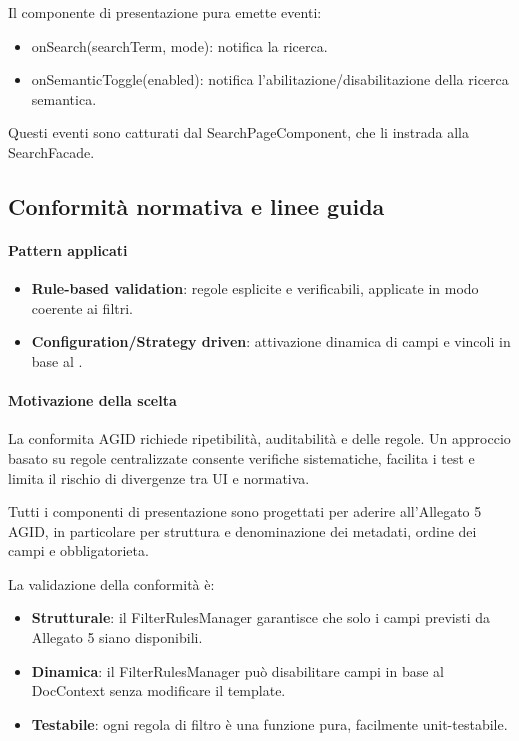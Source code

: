 \noindent Il componente di presentazione pura emette eventi:
\begin{itemize}
    \item onSearch(searchTerm, mode): notifica la ricerca.
    \item onSemanticToggle(enabled): notifica l'abilitazione/disabilitazione della ricerca semantica.
\end{itemize}

\noindent Questi eventi sono catturati dal SearchPageComponent, che li instrada alla SearchFacade.


\subsection{Conformità normativa e linee guida}

\paragraph{Pattern applicati}
\begin{itemize}
    \item \textbf{Rule-based validation}: regole esplicite e verificabili, applicate in modo coerente ai filtri.
    \item \textbf{Configuration/Strategy driven}: attivazione dinamica di campi e vincoli in base al .
\end{itemize}

\paragraph{Motivazione della scelta}
La conformita AGID richiede ripetibilità, auditabilità e  delle regole.
Un approccio basato su regole centralizzate consente verifiche sistematiche, facilita i test e limita il rischio di divergenze tra UI e normativa.

Tutti i componenti di presentazione sono progettati per aderire all'Allegato 5 AGID, in particolare per struttura e denominazione dei metadati, ordine dei campi e obbligatorieta.

\noindent La validazione della conformità è:
\begin{itemize}
    \item \textbf{Strutturale}: il FilterRulesManager garantisce che solo i campi previsti da Allegato 5 siano disponibili.
    \item \textbf{Dinamica}: il FilterRulesManager può disabilitare campi in base al DocContext senza modificare il template.
    \item \textbf{Testabile}: ogni regola di filtro è una funzione pura, facilmente unit-testabile.
\end{itemize}

